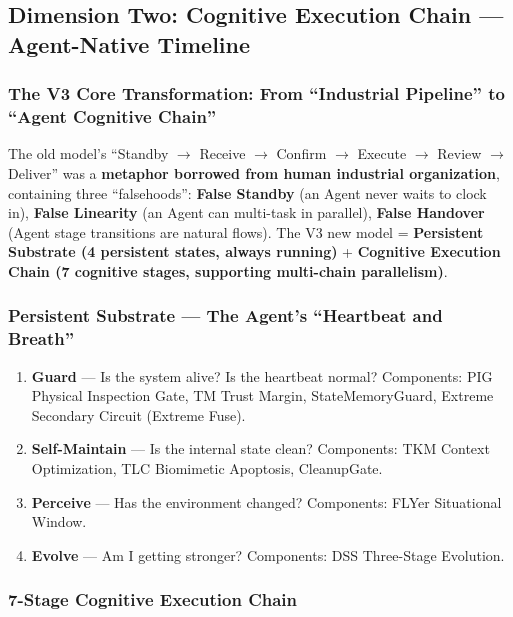 \documentclass[11pt,a4paper]{article}
\begin{document}
\subsection{Dimension Two: Cognitive Execution Chain --- Agent-Native Timeline}
\label{sec:9.3}

\subsubsection*{The V3 Core Transformation: From ``Industrial Pipeline'' to ``Agent Cognitive Chain''}

The old model's ``Standby $\rightarrow$ Receive $\rightarrow$ Confirm $\rightarrow$ Execute $\rightarrow$ Review $\rightarrow$ Deliver'' was a \textbf{metaphor borrowed from human industrial organization}, containing three ``falsehoods'': \textbf{False Standby} (an Agent never waits to clock in), \textbf{False Linearity} (an Agent can multi-task in parallel), \textbf{False Handover} (Agent stage transitions are natural flows). The V3 new model = \textbf{Persistent Substrate (4 persistent states, always running)} + \textbf{Cognitive Execution Chain (7 cognitive stages, supporting multi-chain parallelism)}.

\subsubsection*{Persistent Substrate --- The Agent's ``Heartbeat and Breath''}

\begin{enumerate}
\item \textbf{Guard} --- Is the system alive? Is the heartbeat normal? Components: PIG Physical Inspection Gate, TM Trust Margin, StateMemoryGuard, Extreme Secondary Circuit (Extreme Fuse).
\item \textbf{Self-Maintain} --- Is the internal state clean? Components: TKM Context Optimization, TLC Biomimetic Apoptosis, CleanupGate.
\item \textbf{Perceive} --- Has the environment changed? Components: FLYer Situational Window.
\item \textbf{Evolve} --- Am I getting stronger? Components: DSS Three-Stage Evolution.
\end{enumerate}

\subsubsection*{7-Stage Cognitive Execution Chain}
\end{document}
